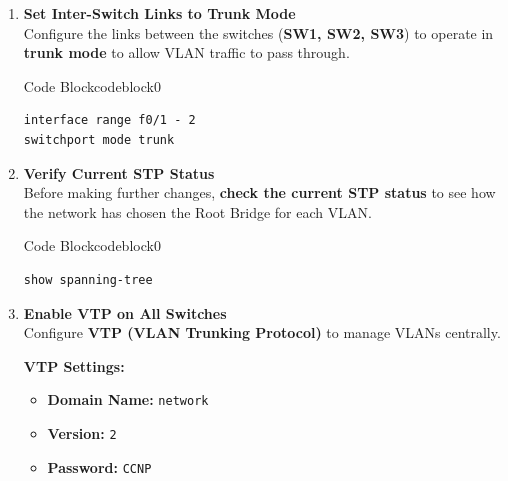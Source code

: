 \documentclass[a4paper]{book}
\begin{document}
\begin{enumerate}

	\item \textbf{Set Inter-Switch Links to Trunk Mode} \\
	      Configure the links between the switches (\textbf{SW1, SW2, SW3}) to operate in \textbf{trunk mode} to allow VLAN traffic to pass through.



	      \begin{ocg}{Code Block}{codeblock}{0}
		      \vspace{0.5cm}
		      \begin{lstlisting}
interface range f0/1 - 2
switchport mode trunk
\end{lstlisting}

	      \end{ocg}
	\item \textbf{Verify Current STP Status} \\
	      Before making further changes, \textbf{check the current STP status} to see how the network has chosen the Root Bridge for each VLAN.



	      \begin{ocg}{Code Block}{codeblock}{0}
		      \vspace{0.5cm}
		      \begin{lstlisting}
show spanning-tree
\end{lstlisting}

	      \end{ocg}

	\item \textbf{Enable VTP on All Switches} \\
	      Configure \textbf{VTP (VLAN Trunking Protocol)} to manage VLANs centrally.

	      \textbf{VTP Settings:}
	      \begin{itemize}
		      \item \textbf{Domain Name:} \texttt{network}
		      \item \textbf{Version:} \texttt{2}
		      \item \textbf{Password:} \texttt{CCNP}
	      \end{itemize}



\end{enumerate}
\end{document}
